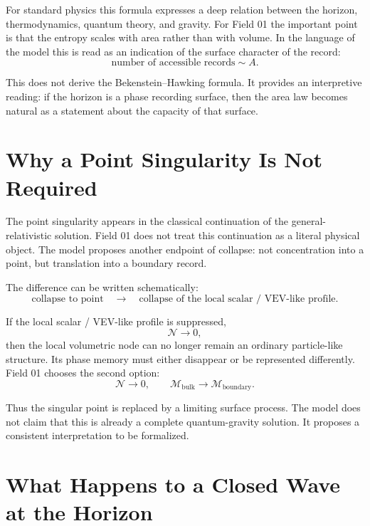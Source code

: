 \documentclass[11pt,a4paper]{article}
\newcommand{\normal}{\mathcal{N}}
\newcommand{\memory}{\mathcal{M}}
\newcommand{\bulk}{\mathrm{bulk}}
\newcommand{\boundary}{\mathrm{boundary}}
\begin{document}
For standard physics this formula expresses a deep relation between the horizon, thermodynamics, quantum theory, and gravity. For Field 01 the important point is that the entropy scales with area rather than with volume. In the language of the model this is read as an indication of the surface character of the record:
\begin{equation}
\text{number of accessible records} \sim A.
\end{equation}

This does not derive the Bekenstein--Hawking formula. It provides an interpretive reading: if the horizon is a phase recording surface, then the area law becomes natural as a statement about the capacity of that surface.

\section{Why a Point Singularity Is Not Required}

The point singularity appears in the classical continuation of the general-relativistic solution. Field 01 does not treat this continuation as a literal physical object. The model proposes another endpoint of collapse: not concentration into a point, but translation into a boundary record.

The difference can be written schematically:
\begin{equation}
\text{collapse to point} \quad \longrightarrow \quad \text{collapse of the local scalar / VEV-like profile}.
\end{equation}

If the local scalar / VEV-like profile is suppressed,
\begin{equation}
\normal \rightarrow 0,
\end{equation}
then the local volumetric node can no longer remain an ordinary particle-like structure. Its phase memory must either disappear or be represented differently. Field 01 chooses the second option:
\begin{equation}
\normal \rightarrow 0,
\qquad
\memory_{\bulk} \rightarrow \memory_{\boundary}.
\end{equation}

Thus the singular point is replaced by a limiting surface process. The model does not claim that this is already a complete quantum-gravity solution. It proposes a consistent interpretation to be formalized.

\section{What Happens to a Closed Wave at the Horizon}
\end{document}
